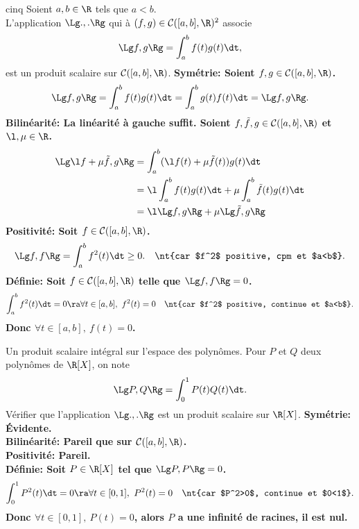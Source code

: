 \documentclass[11pt]{article}
\renewcommand*{\C}{\mathcal{C}}
\begin{document}
\begin{prop}{}{cinq}
    Soient $a,b\in\R$ tels que $a<b$.\\
    L'application $\Lg.,.\Rg$ qui à $(f,g)\in\C([a,b],\R)^2$ associe
    \begin{equation*}
        \Lg f,g \Rg = \int_a^bf(t)g(t)\dt,
    \end{equation*}
    est un produit scalaire sur $\C([a,b],\R)$.
    \tcblower
    \bf{Symétrie:} Soient $f,g\in\C([a,b],\R)$.
    \begin{equation*}
        \Lg f,g \Rg = \int_a^bf(t)g(t)\dt=\int_a^bg(t)f(t)\dt=\Lg f,g \Rg.
    \end{equation*}
    \bf{Bilinéarité:} La linéarité  à gauche suffit. Soient $f,\tilde{f},g\in\C([a,b],\R)$ et $\l,\mu\in\R$.
    \begin{align*}
        \Lg \l f + \mu \tilde{f}, g \Rg &= \int_a^b(\l f(t) + \mu \tilde{f}(t))g(t)\dt\\
        &= \l\int_a^bf(t)g(t)\dt+\mu\int_a^b\tilde{f}(t)g(t)\dt\\
        &= \l\Lg f, g \Rg + \mu \Lg \tilde{f}, g \Rg
    \end{align*}
    \bf{Positivité:} Soit $f\in\C([a,b],\R)$.
    \begin{equation*}
        \Lg f, f \Rg = \int_a^bf^2(t)\dt \geq 0. \quad \nt{car $f^2$ positive, cpm et $a<b$}.
    \end{equation*}
    \bf{Définie:} Soit $f\in\C([a,b],\R)$ telle que $\Lg f, f \Rg=0$.
    \begin{equation*}
        \int_a^b f^2(t)\dt = 0 \ra \forall t \in [a,b], ~ f^2(t)=0 \quad \nt{car $f^2$ positive, continue et $a<b$}.
    \end{equation*}
    Donc $\forall t \in [a,b], ~ f(t)=0$.
\end{prop}

\vspace*{-0.4cm}

\begin{ex}{Un produit scalaire intégral sur l'espace des polynômes.}{}
    Pour $P$ et $Q$ deux polynômes de $\R[X]$, on note
    \begin{equation*}
        \Lg P, Q \Rg = \int_0^1P(t)Q(t)\dt.
    \end{equation*}
    Vérifier que l'application $\Lg.,.\Rg$ est un produit scalaire sur $\R[X]$.
    \tcblower
    \bf{Symétrie:} Évidente.\\
    \bf{Bilinéarité:} Pareil que sur $\C([a,b],\R)$.\\
    \bf{Positivité:} Pareil.\\
    \bf{Définie:} Soit $P\in\R[X]$ tel que $\Lg P,P \Rg=0$.
    \begin{equation*}
        \int_0^1P^2(t)\dt=0 \ra \forall t \in [0,1], ~ P^2(t)=0 \quad \nt{car $P^2>0$, continue et $0<1$}.
    \end{equation*}
    Donc $\forall t \in [0,1], ~ P(t) = 0$, alors $P$ a une infinité de racines, il est \bf{nul}.
\end{ex}
\end{document}
